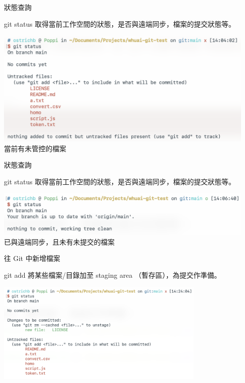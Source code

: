\documentclass[xetex, unicode, 10pt, aspectratio=169]{beamer}
\begin{document}
\begin{frame}{狀態查詢}
    \begin{block}{git status}
        取得當前工作空間的狀態，是否與遠端同步，檔案的提交狀態等。
        \begin{center}
            \includegraphics[width=5in]{./img/git-status-no-commit.png}\\
            當前有未管控的檔案
        \end{center}
    \end{block}
\end{frame}

\begin{frame}{狀態查詢}
    \begin{block}{git status}
        取得當前工作空間的狀態，是否與遠端同步，檔案的提交狀態等。
        \begin{center}
            \includegraphics[width=5in]{./img/git-status-clean.png}\\
            已與遠端同步，且未有未提交的檔案
        \end{center}
    \end{block}
\end{frame}

\begin{frame}{往 Git 中新增檔案}
    \begin{block}{git add}
        將某些檔案/目錄加至 staging area （暫存區），為提交作準備。
        \begin{center}
            \includegraphics[width=4in]{./img/git-add-a-file.png}
        \end{center}
    \end{block}
\end{frame}
\end{document}
